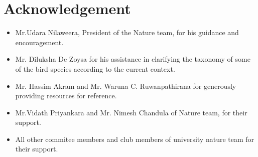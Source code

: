 \chapter{Acknowledgement}
\label{cp:Acknowledgement}
\begin{itemize}
    \item Mr.Udara Nilaweera, President of the Nature team, for his guidance and encouragement.\\
    \item Mr. Diluksha De Zoysa for his assistance in clarifying the taxonomy of some of the bird species according to the current context.\\
    \item Mr. Hassim Akram and Mr. Waruna C. Ruwanpathirana for generously providing resources for reference.\\
    \item Mr.Vidath Priyankara and Mr. Nimesh Chandula of Nature team, for their  support.
    \\
    \item All other commitee members and club members of university nature team for their support.
\end{itemize}